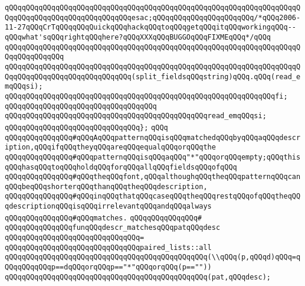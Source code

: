 \verb|qQQqqQQqqQQqqQQqqQQqqQQqqQQqqQQqqQQqqQQqqQQqqQQqqQQqqQQqqQQqqQQqqQQqqQQqqQQqqQQqqQQqqQQqqQQqqQQqqQQqesac;qQQqqQQqqQQqqQQqqQQqqQQq/*qQQq2006-11-27qQQqCrTqQQqqQQqQuickqQQqhackqQQqtoqQQqgetqQQqitqQQqworkingqQQq--qQQqwhat'sqQQqrightqQQqhere?qQQqXXXqQQqBUGGOqQQqFIXMEqQQq*/qQQq|\newline
\verb|qQQqqQQqqQQqqQQqqQQqqQQqqQQqqQQqqQQqqQQqqQQqqQQqqQQqqQQqqQQqqQQqqQQqqQQqqQQqqQQqqQQq|\newline
\verb|qQQqqQQqqQQqqQQqqQQqqQQqqQQqqQQqqQQqqQQqqQQqqQQqqQQqqQQqqQQqqQQqqQQqqQQqqQQqqQQqqQQqqQQqqQQqqQQqqQQq(split_fieldsqQQqstring)qQQq.qQQq(read_emqQQqsi);|\newline
\verb|qQQqqQQqqQQqqQQqqQQqqQQqqQQqqQQqqQQqqQQqqQQqqQQqqQQqqQQqqQQqqQQqfi;|\newline
\verb|qQQqqQQqqQQqqQQqqQQqqQQqqQQqqQQqqQQq|\newline
\verb|qQQqqQQqqQQqqQQqqQQqqQQqqQQqqQQqqQQqqQQqqQQqqQQqread_emqQQqsi;|\newline
\verb|qQQqqQQqqQQqqQQqqQQqqQQqqQQqqQQq};|\newline
\verb|qQQq|\newline
\verb|qQQqqQQqqQQqqQQq#qQQqAqQQqpatternqQQqisqQQqmatchedqQQqbyqQQqaqQQqdescription,qQQqifqQQqtheyqQQqareqQQqequalqQQqorqQQqthe|\newline
\verb|qQQqqQQqqQQqqQQq#qQQqpatternqQQqisqQQqaqQQq"*"qQQqorqQQqempty;qQQqthisqQQqhasqQQqtoqQQqholdqQQqforqQQqallqQQqfieldsqQQqofqQQq|\newline
\verb|qQQqqQQqqQQqqQQq#qQQqtheqQQqfont,qQQqalthoughqQQqtheqQQqpatternqQQqcanqQQqbeqQQqshorterqQQqthanqQQqtheqQQqdescription,|\newline
\verb|qQQqqQQqqQQqqQQq#qQQqinqQQqthatqQQqcaseqQQqtheqQQqrestqQQqofqQQqtheqQQqdescriptionqQQqisqQQqirrelevantqQQqandqQQqalways|\newline
\verb|qQQqqQQqqQQqqQQq#qQQqmatches.|\newline
\verb|qQQqqQQqqQQqqQQq#|\newline
\verb|qQQqqQQqqQQqqQQqfunqQQqdescr_matchesqQQqpatqQQqdesc|\newline
\verb|qQQqqQQqqQQqqQQqqQQqqQQqqQQqqQQq=|\newline
\verb|qQQqqQQqqQQqqQQqqQQqqQQqqQQqqQQqpaired_lists::all|\newline
\verb|qQQqqQQqqQQqqQQqqQQqqQQqqQQqqQQqqQQqqQQqqQQqqQQq(\\qQQq(p,qQQqd)qQQq=qQQqqQQqqQQqp==dqQQqorqQQqp=="*"qQQqorqQQq(p==""))|\newline
\verb|qQQqqQQqqQQqqQQqqQQqqQQqqQQqqQQqqQQqqQQqqQQqqQQq(pat,qQQqdesc);|\newline
